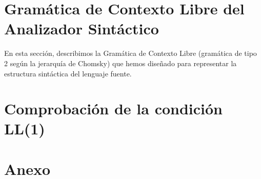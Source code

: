 \documentclass{article}
\begin{document}
\newpage

\section{Gramática de Contexto Libre del Analizador Sintáctico}

En esta sección, describimos la Gramática de Contexto Libre (gramática de tipo 2 según la jerarquía de Chomsky) que hemos diseñado para representar la estructura sintáctica del lenguaje fuente.



\newpage

\section{Comprobación de la condición LL(1)}



\appendix
\section*{Anexo}


\end{document}
